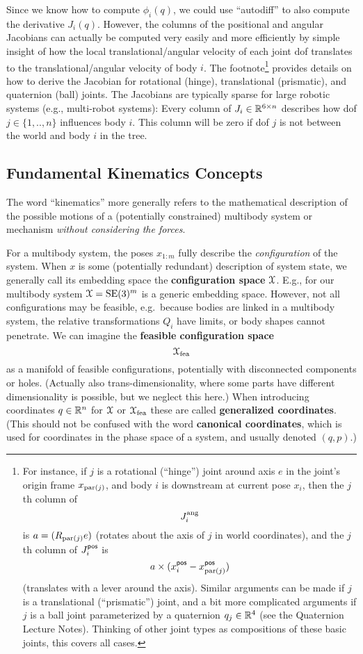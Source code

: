 Since we know how to compute $\phi_i(q)$, we could use ``autodiff'' to
also compute the derivative $J_i(q)$. However, the columns of the positional and
angular Jacobians can actually be computed very easily and more efficiently by simple
insight of how the local translational/angular velocity of each
joint dof translates to the translational/angular velocity of body
$i$. The footnote\footnote{For instance, if $j$ is a rotational (``hinge'') joint
around axis $e$ in the joint's origin frame $x_{\text{par}(j)}$, and body
$i$ is downstream at current pose $x_i$, then the $j$th column of
$$J^{\text{ang}}_i$$ is $a = (R_{\text{par}(j)} e)$ (rotates about the axis of
$j$ in world coordinates), and the $j$th column of $J^{\textsf{pos}}_i$ is
$$a \times (x^{\textsf{pos}}_i - x^{\textsf{pos}}_{\text{par}(j)})$$ (translates with a lever
around the axis). Similar arguments can be made if $j$ is a
translational (``prismatic'') joint, and a bit more complicated
arguments if $j$ is a ball joint parameterized by a quaternion
$q_j \in{\mathbb{R}}^4$ (see the Quaternion Lecture Notes). Thinking of other
joint types as compositions of these basic joints, this covers all
cases.} provides details on how to derive the Jacobian for rotational
(hinge), translational (prismatic), and quaternion (ball) joints.  The
Jacobians are typically sparse for large robotic systems (e.g.,
multi-robot systems): Every column of $J_i\in{\mathbb{R}}^{6\times n}$
describes how dof $j\in\{1,..,n\}$ influences body $i$. This column
will be zero if dof $j$ is not between the world and body $i$ in the
tree.

\subsection{Fundamental Kinematics Concepts}

The word ``kinematics'' more generally refers to the mathematical
description of the possible motions of a (potentially constrained) multibody
system or mechanism \emph{without considering the forces}.

For a multibody system, the poses $x_{1:m}$ fully describe the
\emph{configuration} of the system. When $x$ is some (potentially
redundant) description of system state, we generally call its
embedding space the \textbf{configuration space} ${\cal X}$. E.g., for our
multibody system ${\cal X}=\text{SE}(3)^m$ is a generic embedding space. However, not all
configurations may be feasible, e.g.\ because bodies are linked in a multibody
system, the relative transformations $Q_i$ have limits, or body shapes cannot penetrate. We can imagine the \textbf{feasible configuration space}
%
$$ {\cal X}_{\text{fea}} $$
%
as a manifold of feasible configurations,
potentially with disconnected components or holes. (Actually also
trans-dimensionality, where some parts have different dimensionality
is possible, but we neglect this here.) When introducing coordinates
$q\in{\mathbb{R}}^n$ for ${\cal X}$ or ${\cal X}_\text{fea}$ these are called
\textbf{generalized coordinates}. (This should not be confused with the word
\textbf{canonical coordinates}, which is used for coordinates in the phase
space of a system, and usually denoted $(q,p)$.)

